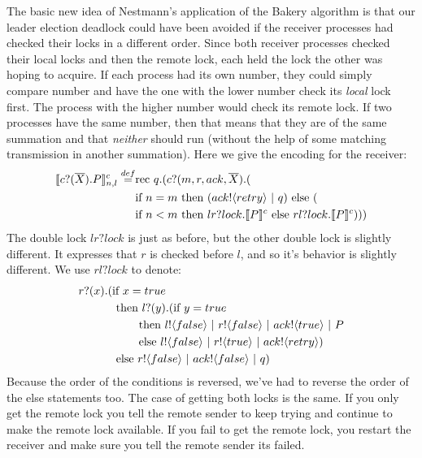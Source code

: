 The basic new idea of Nestmann's application of the Bakery algorithm is that our leader election deadlock could have been avoided if the receiver processes had checked their locks in a different order.  Since both receiver processes checked their local locks and then the remote lock, each held the lock the other was hoping to acquire.  If each process had its own number, they could simply compare number and have the one with the lower number check its \emph{local} lock first.  The process with the higher number would check its remote lock.  If two processes have the same number, then that means that they are of the same summation and that \emph{neither} should run (without the help of some matching transmission in another summation).  Here we give the encoding for the receiver:
\begin{equation*}\begin{split}
	\llbracket{ \ensuremath{{c}?({\overline{X}}).} P}\rrbracket^c_{n,l} \overset{\tiny{def}}{=} & \text{rec }{q}.({c}?({m,r,ack,\overline{X}}).(\\
	&\text{if } {n=m} \text{ then } ({ack}!\langle{retry}\rangle\ |\  q) \text{ else }(\\
	&\text{if } {n<m} \text{ then } lr?lock.\llbracket{P}\rrbracket^c \text{ else } rl?lock.\llbracket{P}\rrbracket^c)))\\
\end{split}\end{equation*}
The double lock $lr?lock$ is just as before, but the other double lock is slightly different.  It expresses that $r$ is checked before $l$, and so it's behavior is slightly different.  We use $rl?lock$ to denote:
\begin{equation}\begin{split}
	{r}?({x}).(&\text{if } {x=true}\\
	&\text{ then } {l}?({y}). (\text{if } {y=true}\\
	&\ \ \ \ \ \ \text{ then } {l}!\langle{false}\rangle \ |\  {r}!\langle{false}\rangle \ |\  {ack}!\langle{true}\rangle \ |\  P\\
	&\ \ \ \ \ \ \text{ else } {l}!\langle{false}\rangle \ |\  {r}!\langle{true}\rangle \ |\  {ack}!\langle{retry}\rangle)\\
	&\text{ else }{r}!\langle{false}\rangle \ |\  {ack}!\langle{false}\rangle\ |\  q)\\
\end{split}\end{equation}%
Because the order of the conditions is reversed, we've had to reverse the order of the else statements too.  The case of getting both locks is the same.  If you only get the remote lock you tell the remote sender to keep trying and continue to make the remote lock available.  If you fail to get the remote lock, you restart the receiver and make sure you tell the remote sender its failed.

